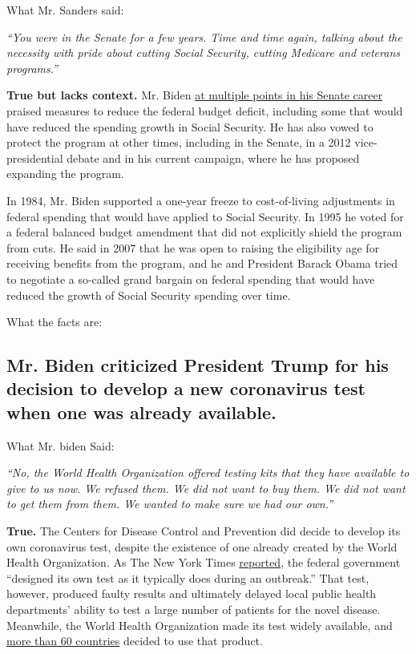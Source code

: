 What Mr. Sanders said:

\emph{``You were in the Senate for a few years. Time and time again,
talking about the necessity with pride about cutting Social Security,
cutting Medicare and veterans programs.''}

\textbf{True but lacks context.} Mr. Biden
\href{https://www.nytimes.com/2020/01/26/us/politics/biden-factcheck.html}{at
multiple points in his Senate career} praised measures to reduce the
federal budget deficit, including some that would have reduced the
spending growth in Social Security. He has also vowed to protect the
program at other times, including in the Senate, in a 2012
vice-presidential debate and in his current campaign, where he has
proposed expanding the program.

In 1984, Mr. Biden supported a one-year freeze to cost-of-living
adjustments in federal spending that would have applied to Social
Security. In 1995 he voted for a federal balanced budget amendment that
did not explicitly shield the program from cuts. He said in 2007 that he
was open to raising the eligibility age for receiving benefits from the
program, and he and President Barack Obama tried to negotiate a
so-called grand bargain on federal spending that would have reduced the
growth of Social Security spending over time.

What the facts are:

\hypertarget{mr-biden-criticized-president-trump-for-his-decision-to-develop-a-new-coronavirus-test-when-one-was-already-available}{%
\subsection{Mr. Biden criticized President Trump for his decision to
develop a new coronavirus test when one was already
available.}\label{mr-biden-criticized-president-trump-for-his-decision-to-develop-a-new-coronavirus-test-when-one-was-already-available}}

What Mr. biden Said:

\emph{``No, the World Health Organization offered testing kits that they
have available to give to us now. We refused them. We did not want to
buy them. We did not want to get them from them. We wanted to make sure
we had our own.''}

\textbf{True.} The Centers for Disease Control and Prevention did decide
to develop its own coronavirus test, despite the existence of one
already created by the World Health Organization. As The New York Times
\href{https://www.nytimes.com/2020/03/10/us/coronavirus-testing-delays.html}{reported},
the federal government ``designed its own test as it typically does
during an outbreak.'' That test, however, produced faulty results and
ultimately delayed local public health departments' ability to test a
large number of patients for the novel disease. Meanwhile, the World
Health Organization made its test widely available, and
\href{https://www.politico.com/news/2020/03/06/coronavirus-testing-failure-123166}{more
than 60 countries} decided to use that product.

